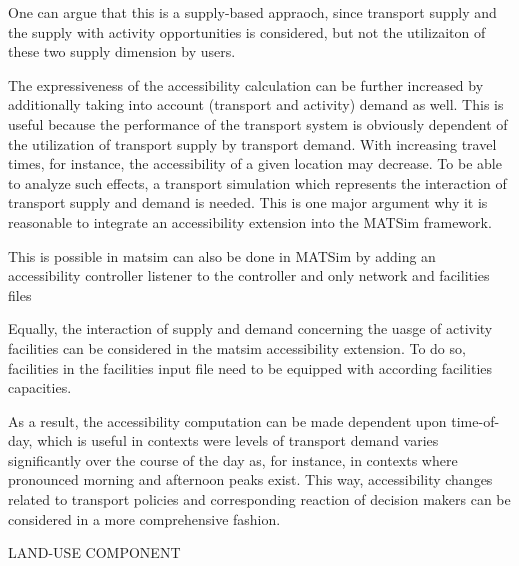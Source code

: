 One can argue that this is a supply-based appraoch, since transport supply and the supply with activity opportunities is considered, but not the utilizaiton of these two supply dimension by users.

The expressiveness of the accessibility calculation can be further increased by additionally taking into account (transport and activity) demand as well. This is useful because the performance of the transport system is obviously dependent of the utilization of transport supply by transport demand. With increasing travel times, for instance, the accessibility of a given location may decrease. To be able to analyze such effects, a transport simulation which represents the interaction of transport supply and demand is needed. This is one major argument why it is reasonable to integrate an accessibility extension into the MATSim framework.

This is possible in \gls{matsim} can also be done in MATSim by adding an accessibility controller listener to the controller and only network and facilities files

Equally, the interaction of supply and demand concerning the uasge of activity facilities can be considered in the \gls{matsim} accessibility extension. To do so, facilities in the facilities input file need to be equipped with according facilities capacities.



As a result, the accessibility computation can be made dependent upon time-of-day, which is useful in contexts were levels of transport demand varies significantly over the course of the day as, for instance, in contexts where pronounced morning and afternoon peaks exist. This way, accessibility changes related to transport policies and corresponding reaction of decision makers can be considered in a more comprehensive fashion.


LAND-USE COMPONENT

